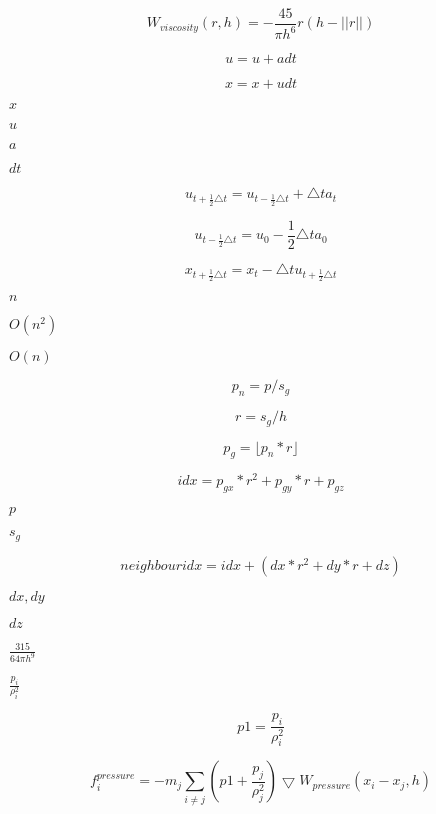 \documentclass{article}
\begin{document}
\[ W_{viscosity}(r,h) = -\frac{45}{\pi h^6}r(h-||r||) \]
\pagebreak

\[ u = u + adt \]
\pagebreak

\[ x = x + udt \]
\pagebreak

$x$
\pagebreak

$u$
\pagebreak

$a$
\pagebreak

$dt$
\pagebreak

\[ u_{t+\frac{1}{2} \triangle t} = u_{t- \frac{1}{2} \triangle t} + \triangle t a_t \]
\pagebreak

\[ u_{t-\frac{1}{2} \triangle t} = u_0 - \frac{1}{2}\triangle t a_0 \]
\pagebreak

\[ x_{t+\frac{1}{2} \triangle t} = x_t - \triangle tu_{t+\frac{1}{2} \triangle t} \]
\pagebreak

$n$
\pagebreak

$O(n^2)$
\pagebreak

$O(n)$
\pagebreak

\[ p_n = p/s_g \]
\pagebreak

\[ r = s_g/h \]
\pagebreak

\[ p_g = \lfloor p_n*r \rfloor \]
\pagebreak

\[ idx = p_{gx}*r^2 + p_{gy}*r +p_{gz} \]
\pagebreak

$p$
\pagebreak

$s_g$
\pagebreak

\[ neighbour idx = idx + (dx*r^2 + dy*r + dz) \]
\pagebreak

$dx,dy$
\pagebreak

$dz$
\pagebreak

$\frac{315}{64\pi h^9}$
\pagebreak

$\frac{p_i}{\rho_i^2}$
\pagebreak

\[ p1 = \frac{p_i}{\rho_i^2} \]
\pagebreak

\[ f_i^{pressure} = -m_j\sum\limits_{i\neq j}(p1 + \frac{p_j}{\rho_j^2})\bigtriangledown W_{pressure}(x_i-x_j,h) \]
\pagebreak
\end{document}
